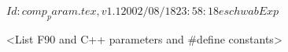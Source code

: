 $Id: comp_param.tex,v 1.1 2002/08/18 23:58:18 eschwab Exp $


<List F90 and C++ parameters and \#define constants>
